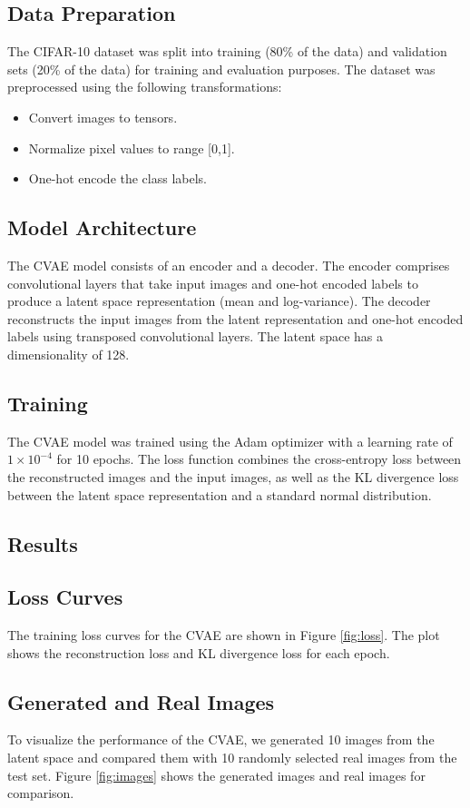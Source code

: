 \documentclass{article}
\begin{document}
\subsection{Data Preparation}
The CIFAR-10 dataset was split into training (80\% of the data) and validation sets (20\% of the data) for training and evaluation purposes. The dataset was preprocessed using the following transformations:
\begin{itemize}
    \item Convert images to tensors.
    \item Normalize pixel values to range [0,1].
    \item One-hot encode the class labels.
\end{itemize}

\subsection{Model Architecture}
The CVAE model consists of an encoder and a decoder. The encoder comprises convolutional layers that take input images and one-hot encoded labels to produce a latent space representation (mean and log-variance). The decoder reconstructs the input images from the latent representation and one-hot encoded labels using transposed convolutional layers. The latent space has a dimensionality of 128.

\subsection{Training}
The CVAE model was trained using the Adam optimizer with a learning rate of \(1 \times 10^{-4}\) for 10 epochs. The loss function combines the cross-entropy loss between the reconstructed images and the input images, as well as the KL divergence loss between the latent space representation and a standard normal distribution.

\subsection{Results}
\subsection{Loss Curves}
The training loss curves for the CVAE are shown in Figure \ref{fig:loss}. The plot shows the reconstruction loss and KL divergence loss for each epoch.


\subsection{Generated and Real Images}
To visualize the performance of the CVAE, we generated 10 images from the latent space and compared them with 10 randomly selected real images from the test set. Figure \ref{fig:images} shows the generated images and real images for comparison.
\end{document}
